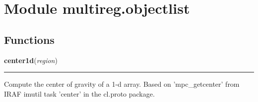 %
%
%


\section{Module multireg.objectlist}

    \label{multireg:objectlist}


  \subsection{Functions}

    \label{multireg:objectlist:center1d}
    \vspace{0.5ex}

    \begin{boxedminipage}{\textwidth}

    \raggedright \textbf{center1d}(\textit{region})

    \vspace{-1.5ex}

    \rule{\textwidth}{0.5\fboxrule}
    Compute the center of gravity of a 1-d array. Based on 
    'mpc\_getcenter' from IRAF imutil task 'center' in the cl.proto 
    package.

    \vspace{1ex}

    \end{boxedminipage}

    \label{multireg:objectlist:find_center}
    \vspace{0.5ex}

